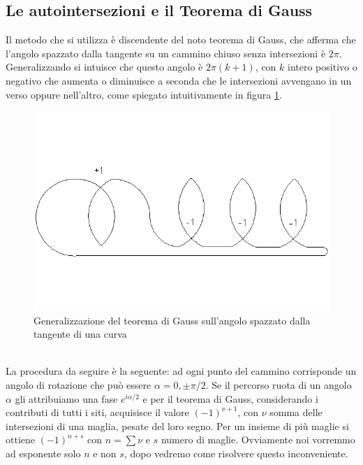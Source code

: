 \documentclass[11pt]{article}
\begin{document}
\subsection{Le autointersezioni e il Teorema di Gauss}
Il metodo che si utilizza è discendente del noto teorema di Gauss, che afferma che l'angolo spazzato dalla tangente su un cammino chiuso senza intersezioni è $2\pi$. Generalizzando si intuisce che questo angolo è $2\pi(k+1)$, con $k$ intero positivo o negativo che aumenta o diminuisce a seconda che le intersezioni avvengano in un verso oppure nell'altro, come spiegato intuitivamente in figura \ref{v3}.
\begin{figure}[h]
\centering
\includegraphics[width=0.65\columnwidth]{curva}
\caption{Generalizzazione del teorema di Gauss sull'angolo spazzato dalla tangente di una curva}
\label{v3}
\end{figure}
\\ La procedura da seguire è la seguente: ad ogni punto del cammino corrisponde un angolo di rotazione che può essere $\alpha=0,\pm\pi/2$. Se il percorso ruota di un angolo $\alpha$ gli attribuiamo una fase $e^{i\alpha/2}$ e per il teorema di Gauss, considerando i contributi di tutti i siti, acquisisce il valore $(-1)^{\nu+1}$, con $\nu$ somma delle intersezioni di una maglia, pesate del loro segno. Per un insieme di più maglie si ottiene $(-1)^{n+s}$ con $n=\sum\nu$ e $s$ numero di maglie. Ovviamente noi vorremmo ad esponente solo $n$ e non $s$, dopo vedremo come risolvere questo inconveniente.
\end{document}
